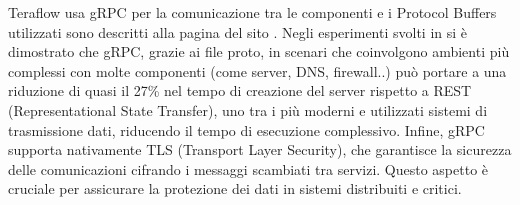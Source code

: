 Teraflow usa gRPC per la comunicazione tra le componenti e i Protocol Buffers utilizzati sono descritti alla pagina del sito \cite{ProtoBuf}.
\newline Negli esperimenti svolti in \cite{espgrpc} si è dimostrato che gRPC, grazie ai file proto, in scenari che coinvolgono ambienti più complessi con molte componenti (come server, DNS, firewall..)
può portare a una riduzione di quasi il 27\% nel tempo di creazione del server rispetto a REST (Representational State Transfer), uno tra i più moderni e utilizzati sistemi di trasmissione dati, riducendo il tempo di esecuzione complessivo.
Infine, gRPC supporta nativamente TLS (Transport Layer Security), che garantisce la sicurezza delle comunicazioni cifrando i messaggi scambiati tra servizi.
Questo aspetto è cruciale per assicurare la protezione dei dati in sistemi distribuiti e critici.

